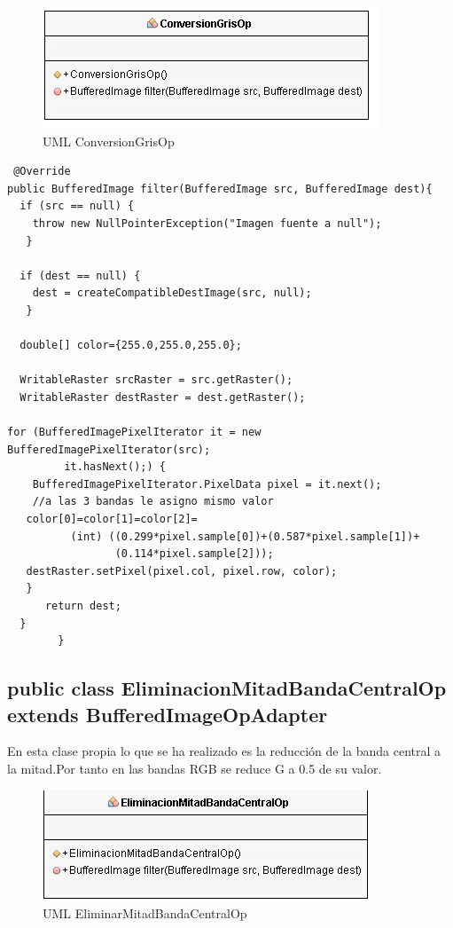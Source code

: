 \begin{figure}[H]
  \centering
    \includegraphics[scale=0.75]{images/conversiongris}
  \caption{UML ConversionGrisOp}
  \label{UML ConversionGrisOp}
\end{figure}

\begin{lstlisting}
 @Override
public BufferedImage filter(BufferedImage src, BufferedImage dest){
  if (src == null) {
    throw new NullPointerException("Imagen fuente a null");
   }
    
  if (dest == null) {
    dest = createCompatibleDestImage(src, null);
   }

  double[] color={255.0,255.0,255.0};
         
  WritableRaster srcRaster = src.getRaster();
  WritableRaster destRaster = dest.getRaster();
  
for (BufferedImagePixelIterator it = new BufferedImagePixelIterator(src); 
         it.hasNext();) {
    BufferedImagePixelIterator.PixelData pixel = it.next();
    //a las 3 bandas le asigno mismo valor
   color[0]=color[1]=color[2]=
          (int) ((0.299*pixel.sample[0])+(0.587*pixel.sample[1])+
                 (0.114*pixel.sample[2]));
   destRaster.setPixel(pixel.col, pixel.row, color);
   }
      return dest;
  }       
        }
\end{lstlisting}

\subsection*{public class EliminacionMitadBandaCentralOp extends BufferedImageOpAdapter}
En esta clase propia lo que se ha realizado es la reducción de la banda central a la mitad.Por tanto en las bandas RGB se reduce G a 0.5 de su valor.

\begin{figure}[H]
  \centering
    \includegraphics[scale=0.75]{images/eliminarbanda}
  \caption{UML EliminarMitadBandaCentralOp}
  \label{UML EliminarMitadBandaCentralOp}
\end{figure}

